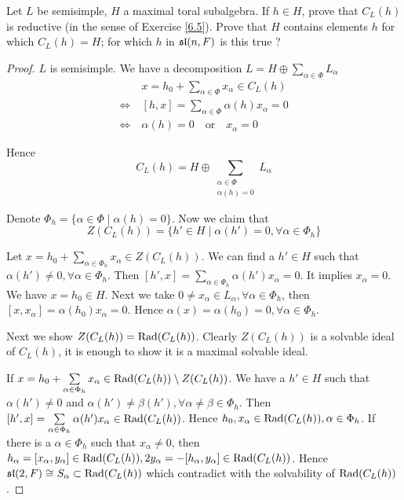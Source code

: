 \begin{ex}\label{8.7}
  Let $L$ be semisimple, $H$ a maximal toral subalgebra. If $h \in H$, prove that $C_L(h)$ is reductive (in the sense of Exercise \ref{6.5}). Prove that $H$ contains elements $h$ for which $C_L(h) = H$; for which $h$ in $\sl(n,F)$ is this true ?
\end{ex}
\begin{proof}
  $L$ is semisimple. We have a decomposition $L = H \oplus\sum\limits_{\alpha\in\Phi} L_{\alpha}$
  \begin{align*}
    &\ x= h_0+ \sum_{\alpha\in\Phi} x_{\alpha} \in C_L(h) \\
    \iff&\ [h,x] = \sum_{\alpha\in\Phi} \alpha(h)x_{\alpha} = 0 \\
    \iff&\ \alpha(h) = 0 \quad\text{or}\quad x_{\alpha} = 0
  \end{align*}

  Hence
  \begin{equation*}
    C_L(h) = H \oplus\sum_{\substack{\alpha\in\Phi\\ \alpha(h)=0}} L_{\alpha}
  \end{equation*}

  Denote $\Phi_h = \{\alpha\in\Phi\mid\alpha(h)=0\}$. Now we claim that
  \begin{equation*}
    Z(C_L(h)) = \{h'\in H\mid \alpha(h') = 0, \forall\alpha\in\Phi_h\}
  \end{equation*}

  Let $x= h_0+ \sum\limits_{\alpha\in\Phi_h} x_{\alpha} \in Z(C_L(h))$. We can find a $h'\in H$ such that $\alpha(h') \neq 0, \forall\alpha\in\Phi_h$. Then $[h',x] = \sum\limits_{\alpha\in\Phi_h} \alpha(h')x_{\alpha} = 0$. It implies $x_{\alpha} = 0$. We have $x = h_0 \in H$. Next we take $0 \neq x_{\alpha} \in L_{\alpha}, \forall \alpha\in\Phi_h$, then $[x,x_{\alpha}] = \alpha(h_0)x_{\alpha} = 0$. Hence $\alpha(x) = \alpha(h_0) = 0, \forall\alpha\in\Phi_h$.

  Next we show $Z(C_L(h)) = \Rad(C_L(h))$. Clearly $Z(C_L(h))$ is a solvable ideal of $C_L(h)$, it is enough to show it is a maximal solvable ideal.

  If $x= h_0+ \sum\limits_{\alpha\in\Phi_h} x_{\alpha} \in \Rad(C_L(h))\setminus Z(C_L(h))$. We have a $h'\in H$ such that $\alpha(h') \neq 0$ and $\alpha(h') \neq \beta(h'), \forall \alpha\neq\beta\in\Phi_h$. Then $[h',x] = \sum\limits_{\alpha\in\Phi_h} \alpha(h')x_{\alpha} \in\Rad(C_L(h))$. Hence $h_0, x_{\alpha}\in \Rad(C_L(h)), \alpha\in\Phi_h$. If there is a $\alpha\in\Phi_h$ such that $x_{\alpha}\neq 0$, then $h_{\alpha} = [x_{\alpha},y_{\alpha}] \in \Rad(C_L(h)), 2y_{\alpha} = -[h_{\alpha}, y_{\alpha}] \in\Rad(C_L(h))$. Hence $\sl(2,F) \cong S_{\alpha}\subset \Rad(C_L(h))$ which contradict with the solvability of $\Rad(C_L(h))$.


\end{proof}
